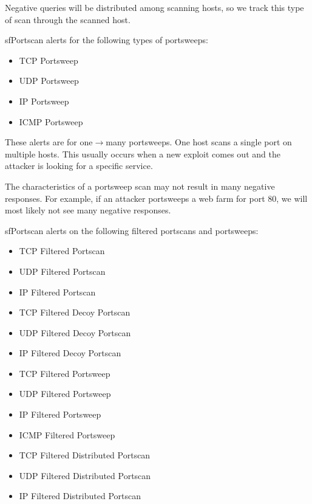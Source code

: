 \documentclass[english]{report}
\newenvironment{note}{
\samepage
    \vspace{10pt}{\textsf{
        {\hspace{7pt}\Huge{$\triangle$\hspace{-12.5pt}{\Large{$^!$}}}}\hspace{5pt}
        {\Large{NOTE}}
    }
    }
   \begin{center}
    \par\vspace{-17pt}

    \begin{lrbox}{\savepar}
    \begin{minipage}[r]{6in}
}
{
    \end{minipage}
    \end{lrbox}
    \fbox{
        \usebox{
            \savepar
	}
    }
    \par\vskip10pt
    \end{center}
}
\newenvironment{note}{
        \begin{rawhtml}
        <p><table border="1"><tr><td><b>
        Note:&nbsp;&nbsp;</b>
        \end{rawhtml}
}{
        \begin{rawhtml}
        </b></td></tr></table></p>
        \end{rawhtml}
}
\begin{document}
\begin{note}
Negative queries will be distributed among scanning hosts, so
we track this type of scan through the scanned host.
\end{note}

sfPortscan alerts for the following types of portsweeps:
\begin{itemize}
\item TCP Portsweep
\item UDP Portsweep
\item IP Portsweep
\item ICMP Portsweep
\end{itemize}

These alerts are for one$\rightarrow$many portsweeps. One host scans a single port
on multiple hosts. This usually occurs when a new exploit comes out and the
attacker is looking for a specific service. 

\begin{note}
The characteristics of a portsweep scan may not result in many
negative responses. For example, if an attacker portsweeps a web farm
for port 80, we will most likely not see many negative responses.
\end{note}

sfPortscan alerts on the following filtered portscans and portsweeps:

\begin{itemize}
\item TCP Filtered Portscan
\item UDP Filtered Portscan
\item IP Filtered Portscan

\item TCP Filtered Decoy Portscan
\item UDP Filtered Decoy Portscan
\item IP Filtered Decoy Portscan

\item TCP Filtered Portsweep
\item UDP Filtered Portsweep
\item IP Filtered Portsweep
\item ICMP Filtered Portsweep

\item TCP Filtered Distributed Portscan
\item UDP Filtered Distributed Portscan
\item IP Filtered Distributed Portscan
\end{itemize}
\end{document}
